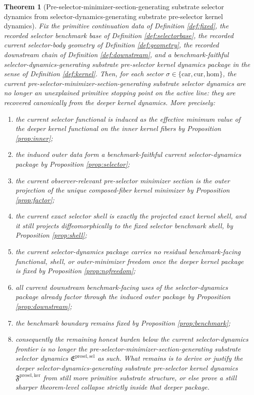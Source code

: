 \documentclass[11pt]{article}
\newcommand{\Car}{\mathrm{car}}
\newcommand{\Cur}{\mathrm{cur}}
\newcommand{\Hom}{\mathrm{hom}}
\newcommand{\PreSectionSelectorPackage}{\mathfrak E^{\mathrm{presel,sel}}}
\newcommand{\KernelPackage}{\mathfrak F^{\mathrm{presel,ker}}}
\newtheorem{theorem}{Theorem}
\begin{document}
\begin{theorem}[Pre-selector-minimizer-section-generating substrate selector dynamics from selector-dynamics-generating substrate pre-selector kernel dynamics]
\label{thm:main}
Fix the primitive continuation data of Definition \ref{def:fixed}, the recorded selector benchmark base of Definition \ref{def:selectorbase}, the recorded current selector-body geometry of Definition \ref{def:geometry}, the recorded downstream chain of Definition \ref{def:downstream}, and a benchmark-faithful selector-dynamics-generating substrate pre-selector kernel dynamics package in the sense of Definition \ref{def:kernel}. Then, for each sector \(\sigma\in\{\Car,\Cur,\Hom\}\), the current pre-selector-minimizer-section-generating substrate selector dynamics are no longer an unexplained primitive stopping point on the active line: they are recovered canonically from the deeper kernel dynamics. More precisely:
\begin{enumerate}
    \item the current selector functional is induced as the effective minimum value of the deeper kernel functional on the inner kernel fibers by Proposition \ref{prop:inner};
    \item the induced outer data form a benchmark-faithful current selector-dynamics package by Proposition \ref{prop:selector};
    \item the current observer-relevant pre-selector minimizer section is the outer projection of the unique composed-fiber kernel minimizer by Proposition \ref{prop:factor};
    \item the current exact selector shell is exactly the projected exact kernel shell, and it still projects diffeomorphically to the fixed selector benchmark shell, by Proposition \ref{prop:shell};
    \item the current selector-dynamics package carries no residual benchmark-facing functional, shell, or outer-minimizer freedom once the deeper kernel package is fixed by Proposition \ref{prop:nofreedom};
    \item all current downstream benchmark-facing uses of the selector-dynamics package already factor through the induced outer package by Proposition \ref{prop:downstream};
    \item the benchmark boundary remains fixed by Proposition \ref{prop:benchmark};
    \item consequently the remaining honest burden below the current selector-dynamics frontier is no longer the pre-selector-minimizer-section-generating substrate selector dynamics \(\PreSectionSelectorPackage\) as such. What remains is to derive or justify the deeper selector-dynamics-generating substrate pre-selector kernel dynamics \(\KernelPackage\) from still more primitive substrate structure, or else prove a still sharper theorem-level collapse strictly inside that deeper package.
\end{enumerate}
\end{theorem}
\end{document}

